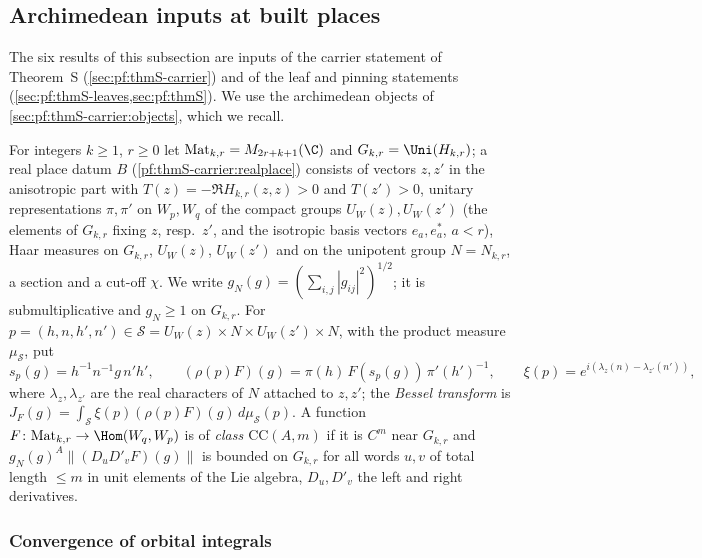 \subsection{Archimedean inputs at built places}\label{sec:pf:sh-curv:arch}

The six results of this subsection are inputs of the carrier statement of Theorem~S (\cref{sec:pf:thmS-carrier}) and of
the leaf and pinning statements (\cref{sec:pf:thmS-leaves,sec:pf:thmS}). We use the archimedean objects of
\cref{sec:pf:thmS-carrier:objects}, which we recall.

\begin{definition}\label{pf:sh-curv:archdef}
For integers $k\ge1$, $r\ge0$ let $\mathrm{Mat}_{k,r}=M_{2r+k+1}(\C)$ and
$G_{k,r}=\Uni(H_{k,r})$; a real place datum $B$ (\cref{pf:thmS-carrier:realplace}) consists of vectors $z,z'$ in the
anisotropic part with $T(z)=-\Re H_{k,r}(z,z)>0$ and $T(z')>0$, unitary representations $\pi,\pi'$ on $W_p,W_q$ of the
compact groups $U_W(z),U_W(z')$ (the elements of $G_{k,r}$ fixing $z$, resp.\ $z'$, and the isotropic basis vectors
$e_a,e^*_a$, $a<r$), Haar measures on $G_{k,r}$, $U_W(z)$, $U_W(z')$ and on the unipotent group $N=N_{k,r}$, a section
and a cut-off $\chi$. We write $g_N(g)=(\sum_{i,j}|g_{ij}|^2)^{1/2}$; it is submultiplicative and $g_N\ge1$ on $G_{k,r}$.
For $p=(h,n,h',n')\in\mathcal S=U_W(z)\times N\times U_W(z')\times N$, with the product measure $\mu_{\mathcal S}$, put
\[
s_p(g)=h^{-1}n^{-1}g\,n'h',\qquad(\rho(p)F)(g)=\pi(h)\,F(s_p(g))\,\pi'(h')^{-1},\qquad
\xi(p)=e^{i(\lambda_z(n)-\lambda_{z'}(n'))},
\]
where $\lambda_z,\lambda_{z'}$ are the real characters of $N$ attached to $z,z'$; the \emph{Bessel transform} is
$J_F(g)=\int_{\mathcal S}\xi(p)(\rho(p)F)(g)\,d\mu_{\mathcal S}(p)$. A function $F\colon\mathrm{Mat}_{k,r}\to\Hom(W_q,W_p)$
is of \emph{class $\mathrm{CC}(A,m)$} if it is $C^m$ near $G_{k,r}$ and $g_N(g)^A\|(D_uD'_vF)(g)\|$ is bounded on $G_{k,r}$ for
all words $u,v$ of total length $\le m$ in unit elements of the Lie algebra, $D_u,D'_v$ the left and right derivatives.
\end{definition}

\subsubsection{Convergence of orbital integrals}

